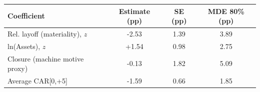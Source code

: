 \begin{tabular}{lccc}
\toprule
Coefficient & Estimate (pp) & SE (pp) & MDE 80\% (pp) \\
\midrule
Rel. layoff (materiality), $z$ & -2.53 & 1.39 & 3.89 \\
ln(Assets), $z$ & +1.54 & 0.98 & 2.75 \\
Closure (machine motive proxy) & -0.13 & 1.82 & 5.09 \\
Average CAR[0,+5] & -1.59 & 0.66 & 1.85 \\
\bottomrule
\end{tabular}
